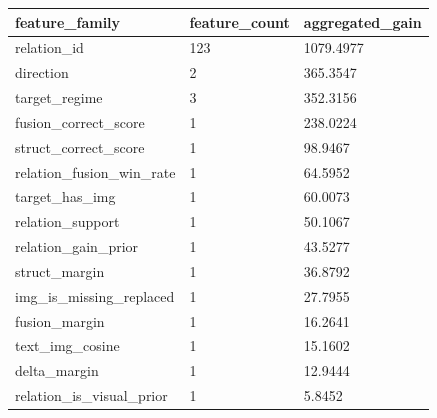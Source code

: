 \begin{tabular}{lll}
\toprule
feature_family & feature_count & aggregated_gain \\
\midrule
relation_id & 123 & 1079.4977 \\
direction & 2 & 365.3547 \\
target_regime & 3 & 352.3156 \\
fusion_correct_score & 1 & 238.0224 \\
struct_correct_score & 1 & 98.9467 \\
relation_fusion_win_rate & 1 & 64.5952 \\
target_has_img & 1 & 60.0073 \\
relation_support & 1 & 50.1067 \\
relation_gain_prior & 1 & 43.5277 \\
struct_margin & 1 & 36.8792 \\
img_is_missing_replaced & 1 & 27.7955 \\
fusion_margin & 1 & 16.2641 \\
text_img_cosine & 1 & 15.1602 \\
delta_margin & 1 & 12.9444 \\
relation_is_visual_prior & 1 & 5.8452 \\
\bottomrule
\end{tabular}